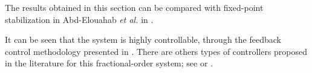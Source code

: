 The results obtained in this section can be compared with fixed-point stabilization in Abd-Elouahab \textit{et al.} in \cite{abd2010chaos}.

It can be seen that the system is highly controllable, through the feedback control methodology presented in \cite{abd2010chaos}. There are others types of controllers proposed in the literature for this fractional-order system; see \cite{pan2015multi} or \cite{yang2017modified}.




